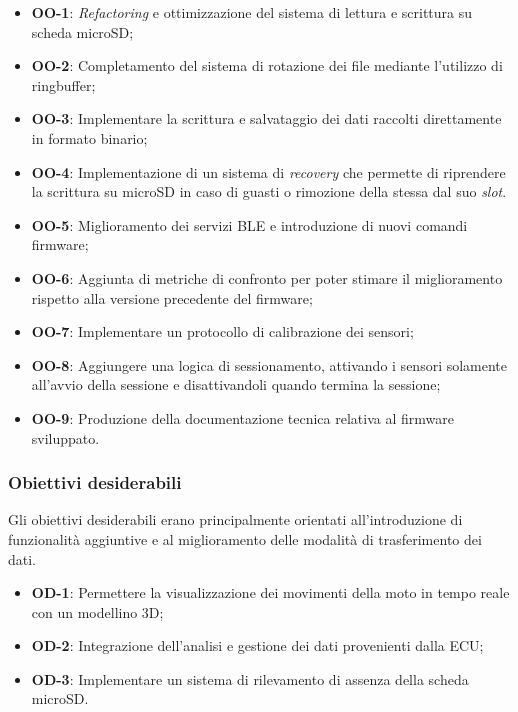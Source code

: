 \begin{itemize}
    \item \textbf{OO-1}: \textit{Refactoring} e ottimizzazione del sistema di lettura e scrittura su scheda microSD;

    \item \textbf{OO-2}: Completamento del sistema di rotazione dei file mediante l'utilizzo di \gls{ringbuffer};

    \item \textbf{OO-3}: Implementare la scrittura e salvataggio dei dati raccolti direttamente in formato binario;

    \item \textbf{OO-4}: Implementazione di un sistema di \textit{recovery} che permette di riprendere la scrittura su microSD
    in caso di guasti o rimozione della stessa dal suo \textit{slot}.

    \item \textbf{OO-5}: Miglioramento dei servizi BLE e introduzione di nuovi comandi firmware;
    
    \item \textbf{OO-6}: Aggiunta di metriche di confronto per poter stimare il miglioramento rispetto 
    alla versione precedente del firmware;

    \item \textbf{OO-7}: Implementare un protocollo di calibrazione dei sensori;
    
    \item \textbf{OO-8}: Aggiungere una logica di sessionamento, attivando i sensori solamente all'avvio della sessione e disattivandoli 
    quando termina la sessione;

    \item \textbf{OO-9}: Produzione della documentazione tecnica relativa al firmware sviluppato.
\end{itemize}


\subsubsection{Obiettivi desiderabili}

Gli obiettivi desiderabili erano principalmente orientati all'introduzione di funzionalità aggiuntive
e al miglioramento delle modalità di trasferimento dei dati.

\begin{itemize}

    \item \textbf{OD-1}: Permettere la visualizzazione dei movimenti della moto in tempo reale con un modellino 3D;

    \item \textbf{OD-2}: Integrazione dell'analisi e gestione dei dati provenienti dalla ECU;
    
    \item \textbf{OD-3}: Implementare un sistema di rilevamento di assenza della scheda microSD.

\end{itemize}


